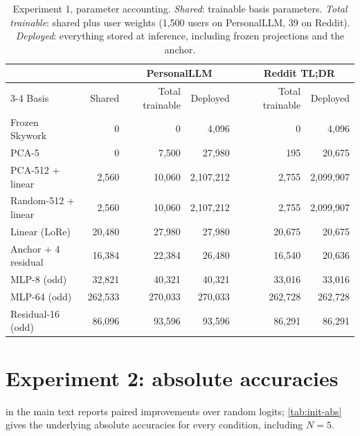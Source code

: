 \documentclass[11pt,a4paper]{article}
\begin{document}
\begin{table}[ht]
\centering\small
\caption{Experiment 1, parameter accounting. \emph{Shared}: trainable basis parameters. \emph{Total
trainable}: shared plus user weights (1{,}500 users on PersonalLLM, 39 on Reddit). \emph{Deployed}: everything
stored at inference, including frozen projections and the anchor.}
\label{tab:params}
\begin{tabular}{@{}l r rr c rr@{}}
\toprule
& & \multicolumn{2}{c}{PersonalLLM} && \multicolumn{2}{c}{Reddit TL;DR}\\
\cmidrule{3-4}\cmidrule{6-7}
Basis & Shared & Total trainable & Deployed && Total trainable & Deployed\\
\midrule
Frozen Skywork & 0 & 0 & 4{,}096 && 0 & 4{,}096\\
PCA-5 & 0 & 7{,}500 & 27{,}980 && 195 & 20{,}675\\
PCA-512 + linear & 2{,}560 & 10{,}060 & 2{,}107{,}212 && 2{,}755 & 2{,}099{,}907\\
Random-512 + linear & 2{,}560 & 10{,}060 & 2{,}107{,}212 && 2{,}755 & 2{,}099{,}907\\
Linear (LoRe) & 20{,}480 & 27{,}980 & 27{,}980 && 20{,}675 & 20{,}675\\
Anchor + 4 residual & 16{,}384 & 22{,}384 & 26{,}480 && 16{,}540 & 20{,}636\\
MLP-8 (odd) & 32{,}821 & 40{,}321 & 40{,}321 && 33{,}016 & 33{,}016\\
MLP-64 (odd) & 262{,}533 & 270{,}033 & 270{,}033 && 262{,}728 & 262{,}728\\
Residual-16 (odd) & 86{,}096 & 93{,}596 & 93{,}596 && 86{,}291 & 86{,}291\\
\bottomrule
\end{tabular}
\end{table}

\section{Experiment 2: absolute accuracies}
\label{app:init}
 in the main text reports paired improvements over random logits; \cref{tab:init-abs} gives
the underlying absolute accuracies for every condition, including $N=5$.
\end{document}
